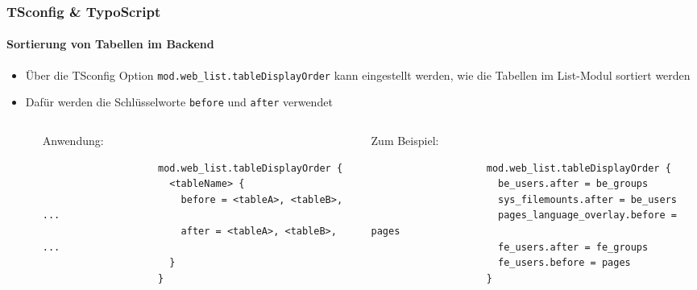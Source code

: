 \begin{frame}[fragile]
	\frametitle{TSconfig \& TypoScript}
	\framesubtitle{Sortierung von Tabellen im Backend}

	\lstset{basicstyle=\tiny\ttfamily}

	\begin{itemize}

		\item Über die TSconfig Option \texttt{mod.web\_list.tableDisplayOrder} kann eingestellt werden,
			wie die Tabellen im List-Modul sortiert werden
		\item Dafür werden die Schlüsselworte \texttt{before} und \texttt{after} verwendet

		\begin{columns}[T]
			\begin{column}{.07\textwidth}
			\end{column}
			\begin{column}{.465\textwidth}

				\small Anwendung:\normalsize

				\begin{lstlisting}
					mod.web_list.tableDisplayOrder {
					  <tableName> {
					    before = <tableA>, <tableB>, ...
					    after = <tableA>, <tableB>, ...
					  }
					}
				\end{lstlisting}
			\end{column}
			\begin{column}{.465\textwidth}

				\small Zum Beispiel:\normalsize

				\begin{lstlisting}
					mod.web_list.tableDisplayOrder {
					  be_users.after = be_groups
					  sys_filemounts.after = be_users
					  pages_language_overlay.before = pages
					  fe_users.after = fe_groups
					  fe_users.before = pages
					}
				\end{lstlisting}

			\end{column}
		\end{columns}

	\end{itemize}

\end{frame}


